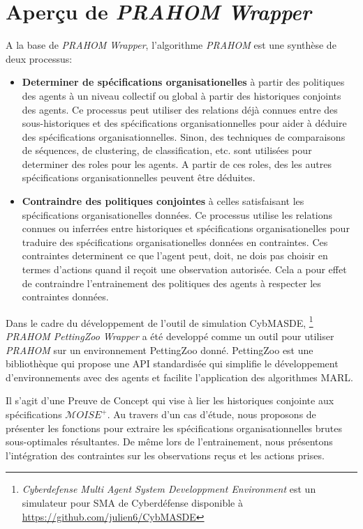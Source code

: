 \documentclass[demonstration]{jfsma}
\newcounter{relation}
\begin{document}

\section{Aperçu de \emph{PRAHOM Wrapper}}

A la base de \emph{PRAHOM Wrapper}, l'algorithme \emph{PRAHOM} est une synthèse de deux processus:

\begin{itemize}
  \item \textbf{Determiner de spécifications organisationelles} à partir des politiques des agents à un niveau collectif ou global à partir des historiques conjoints des agents. Ce processus peut utiliser des relations déjà connues entre des sous-historiques et des spécifications organisationnelles pour aider à déduire des spécifications organisationnelles. Sinon, des techniques de comparaisons de séquences, de clustering, de classification, etc. sont utilisées pour determiner des roles pour les agents. A partir de ces roles, des les autres spécifications organisationnelles peuvent être déduites.
  \item \textbf{Contraindre des politiques conjointes} à celles satisfaisant les spécifications organisationelles données. Ce processus utilise les relations connues ou inferrées entre historiques et spécifications organisationelles pour traduire des spécifications organisationelles données en contraintes. Ces contraintes determinent ce que l'agent peut, doit, ne dois pas choisir en termes d'actions quand il reçoit une observation autorisée. Cela a pour effet de contraindre l'entrainement des politiques des agents à respecter les contraintes données.
\end{itemize}

Dans le cadre du développement de l'outil de simulation CybMASDE,
\footnote{\emph{Cyberdefense Multi Agent System Developpment Environment} est un simulateur pour SMA de Cyberdéfense disponible à \url{https://github.com/julien6/CybMASDE}}
\emph{PRAHOM PettingZoo Wrapper}\label{PettingZoo-wrapper} a été developpé comme un outil pour utiliser \emph{PRAHOM} sur un environnement PettingZoo donné. PettingZoo est une bibliothèque qui propose une API standardisée qui simplifie le développement d'environnements avec des agents et facilite l'application des algorithmes MARL.

Il s'agit d'une Preuve de Concept qui vise à lier les historiques conjointe aux spécifications $\mathcal{M}OISE^+$. Au travers d'un cas d'étude, nous proposons de présenter les fonctions pour extraire les spécifications organisationnelles brutes sous-optimales résultantes. De même lors de l'entrainement, nous présentons l'intégration des contraintes sur les observations reçus et les actions prises.
\end{document}
